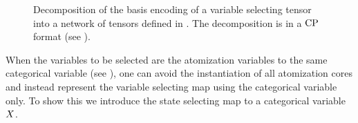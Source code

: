 
\begin{figure}[h]
    \begin{center}
        
    \end{center}
    \caption{Decomposition of the basis encoding of a variable selecting tensor into a network of tensors defined in .
    The decomposition is in a $\mathrm{CP}$ format (see ). %
    }
    \label{fig:SelectorDecomposition}
\end{figure}





When the variables to be selected are the atomization variables to the same categorical variable (see ), one can avoid the instantiation of all atomization cores and instead represent the variable selecting map using the categorical variable only.
To show this we introduce the state selecting map to a categorical variable $X$.

